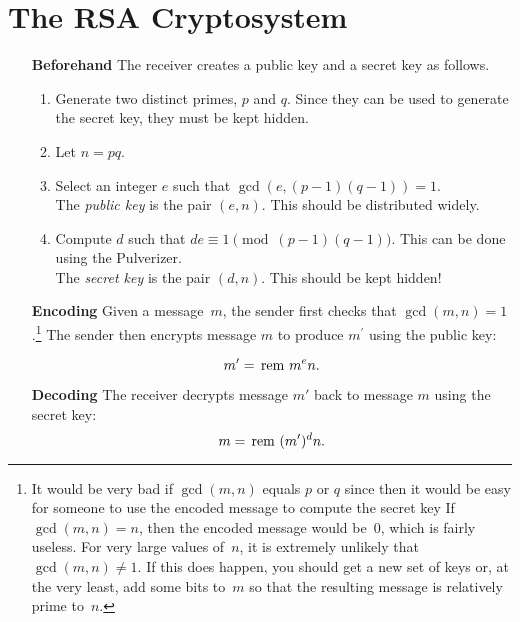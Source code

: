 \documentclass[12pt]{article}
\begin{document}

\section*{The RSA Cryptosystem}

\begin{enumerate}

\item[\textbf{Beforehand}] The receiver creates a public key and a secret key
as follows.

\begin{enumerate}

\item Generate two distinct primes, $p$ and $q$.  Since they can be
used to generate the secret key, they must be kept hidden.

\item Let $n = pq$.

\item Select an integer $e$ such that $\gcd(e, (p-1)(q-1)) = 1$.\\ The
\emph{public key} is the pair $(e, n)$.  This should be distributed
widely.

\item Compute $d$ such that $de \equiv 1 \pmod{(p-1)(q-1)}$.  This
can be done using the Pulverizer.\\ The
\emph{secret key} is the pair $(d, n)$.  This should be kept hidden!

\end{enumerate}

\item[\textbf{Encoding}]
Given a message~$m$, the sender first checks that $\gcd(m, n) =
1$.\footnote{It would be very bad if $\gcd(m, n)$ equals $p$ or $q$
since then it would be easy for someone to use the encoded message to
compute the secret key  If $\gcd(m, n) = n$, then the encoded message
would be~0, which is fairly useless.  For very large values of~$n$, it
is extremely unlikely that $\gcd(m, n) \ne 1$.  If this does happen,
you should get a new set of keys or, at the very least, add some bits
to~$m$ so that the resulting message is relatively prime to~$n$.}
The sender then encrypts message $m$ to produce $m^\prime$ using
the public key:

\[
m' = \operatorname{\,rem\,}{m^e}{n}.
\]

\item[\textbf{Decoding}] The receiver decrypts message $m'$ back to message $m$
using the secret key:
\[
m = \operatorname{\,rem\,}{(m')^d}{n}.
\]

\end{enumerate}
\end{document}
